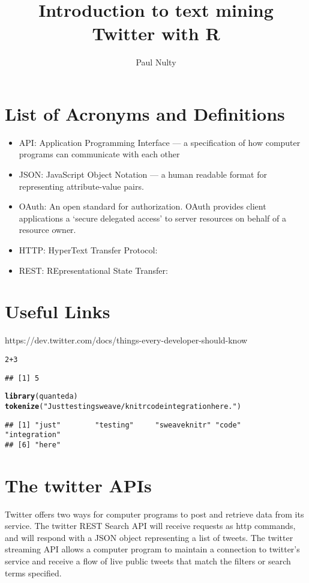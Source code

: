 \documentclass{article}\usepackage[]{graphicx}\usepackage[]{color}
\title{Introduction to text mining Twitter with R}
\author{Paul Nulty}
\makeatletter
\newcommand{\hlnum}[1]{\textcolor[rgb]{0.686,0.059,0.569}{#1}}%
\newcommand{\hlstr}[1]{\textcolor[rgb]{0.192,0.494,0.8}{#1}}%
\newcommand{\hlopt}[1]{\textcolor[rgb]{0,0,0}{#1}}%
\newcommand{\hlstd}[1]{\textcolor[rgb]{0.345,0.345,0.345}{#1}}%
\newcommand{\hlkwd}[1]{\textcolor[rgb]{0.737,0.353,0.396}{\textbf{#1}}}%
\newenvironment{kframe}{%
 \def\at@end@of@kframe{}%
 \ifinner\ifhmode%
  \def\at@end@of@kframe{\end{minipage}}%
  \begin{minipage}{\columnwidth}%
 \fi\fi%
 \def\FrameCommand##1{\hskip\@totalleftmargin \hskip-\fboxsep
 \colorbox{shadecolor}{##1}\hskip-\fboxsep
     \hskip-\linewidth \hskip-\@totalleftmargin \hskip\columnwidth}%
 \MakeFramed {\advance\hsize-\width
   \@totalleftmargin\z@ \linewidth\hsize
   \@setminipage}}%
 {\par\unskip\endMakeFramed%
 \at@end@of@kframe}
\newenvironment{knitrout}{}{} %
\makeatother
\begin{document}
\maketitle
\section{List of Acronyms and Definitions}
\begin{itemize}
  \item API: Application Programming Interface --- a specification of how computer programs can communicate with each other
  \item JSON: JavaScript Object Notation --- a human readable format for representing attribute-value pairs.
  \item OAuth: An open standard for authorization. OAuth provides client applications a `secure delegated access' to server resources on behalf of a resource owner.
  \item HTTP: HyperText Transfer Protocol: 
  \item REST: REpresentational State Transfer:
\end{itemize}

\section*{Useful Links}
https://dev.twitter.com/docs/things-every-developer-should-know

\begin{knitrout}
\color{fgcolor}\begin{kframe}
\begin{alltt}
\hlnum{2} \hlopt{+} \hlnum{3}
\end{alltt}
\begin{verbatim}
## [1] 5
\end{verbatim}
\begin{alltt}
\hlkwd{library}\hlstd{(quanteda)}
\hlkwd{tokenize}\hlstd{(}\hlstr{"Just testing sweave/knitr code integration here."}\hlstd{)}
\end{alltt}
\begin{verbatim}
## [1] "just"        "testing"     "sweaveknitr" "code"        "integration"
## [6] "here"
\end{verbatim}
\end{kframe}
\end{knitrout}



\section*{The twitter APIs}
Twitter offers two ways for computer programs to post and retrieve data from its service. The twitter REST Search API will receive requests as http commands, and will respond with a JSON object representing a list of tweets. The twitter streaming API allows a computer program to maintain a connection to twitter's service and receive a flow of live public tweets that match the filters or search terms specified.
\end{document}
